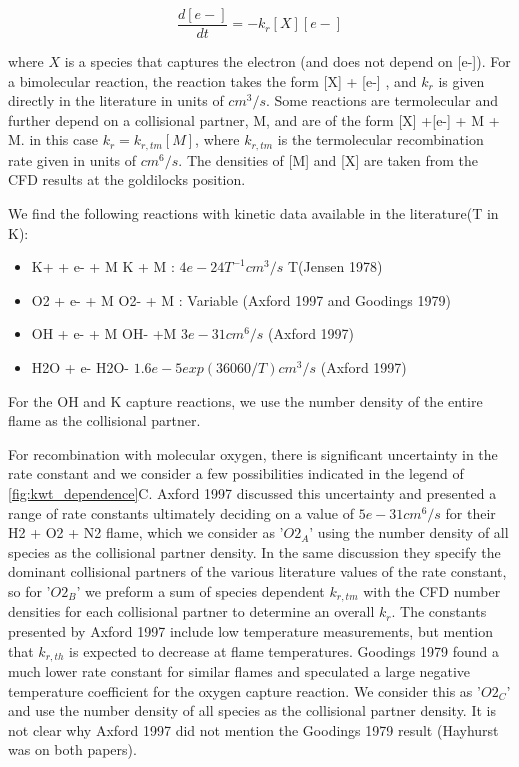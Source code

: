 \begin{equation}
    \frac{d[e-]}{dt} = - k_r [X][e-]
\end{equation}

where $X$ is a species that captures the electron (and does not depend on [e-]). For a bimolecular reaction, the reaction takes the form [X] + [e-] \rightarrow [X-], and $k_r$ is given directly in the literature in units of $cm^3/s$. Some reactions are termolecular and further depend on a collisional partner, M, and are of the form [X] +[e-] + M \rightarrow [X-] + M. in this case $k_r = k_{r,tm} [M]$, where $k_{r,tm}$ is the termolecular recombination rate given in units of $cm^6/s$.  The densities of [M] and [X] are taken from the CFD results at the goldilocks position.

We find the following reactions with kinetic data available in the literature(T in K):

\begin{itemize}
    \item K+ + e- + M \rightarrow K + M : $4e-24 T^{-1} cm^3/s$ T(Jensen 1978) 
    \item O2 + e- + M \rightarrow O2- + M : Variable (Axford 1997 and Goodings 1979)
    \item OH + e- + M \rightarrow OH- +M  $3e-31 cm^6/s$ (Axford 1997)
    \item H2O + e- \rightarrow H2O- $1.6e-5 exp(36060/T) cm^3/s$ (Axford 1997)
\end{itemize}

For the OH and K capture reactions, we use the number density of the entire flame as the collisional partner. 

For recombination with molecular oxygen, there is significant uncertainty in the rate constant and we consider a few possibilities indicated in the legend of \ref{fig:kwt_dependence}C. Axford 1997 discussed this uncertainty and presented a range of rate constants ultimately deciding on a value of $5e-31 cm^6/s$ for their H2 + O2 + N2 flame, which we consider as '$O2_A$' using the number density of all species as the collisional partner density. In the same discussion they specify the dominant collisional partners of the various literature values of the rate constant, so for '$O2_B$' we preform a sum of species dependent $k_{r,tm}$ with the CFD number densities for each collisional partner to determine an overall $k_r$. The constants presented by Axford 1997 include low temperature measurements, but mention that $k_{r,th}$ is expected to decrease at flame temperatures. Goodings 1979 found a much lower rate constant for similar flames and speculated a large negative temperature coefficient for the oxygen capture reaction. We consider this as '$O2_C$' and use the number density of all species as the collisional partner density. It is not clear why Axford 1997 did not mention the Goodings 1979 result (Hayhurst was on both papers). 


